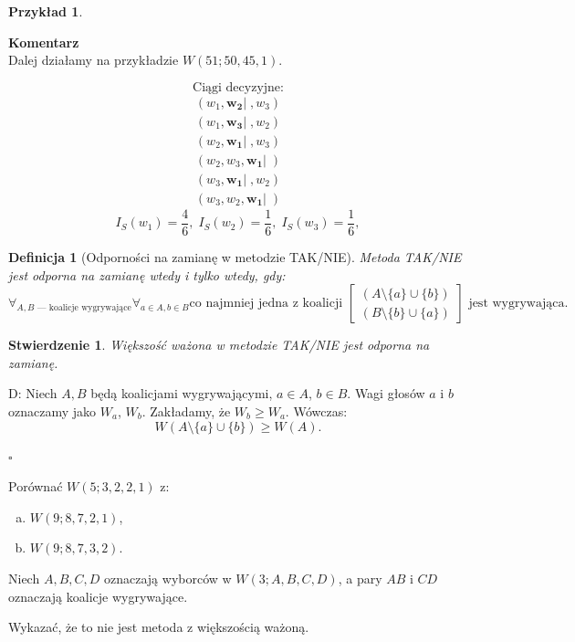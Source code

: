 \documentclass[12pt,a4paper]{article}
\newcounter{twierdzenie}
\theoremstyle{break}
\newcommand{\Komentarz}[1]{
	\begin{mdframed}[style=zadanie]
		\textbf{Komentarz}\\
		#1
	\end{mdframed}
	}
\newtheorem{definition}{Definicja}[section]
\newtheorem{example}{Przykład}[section]
\newtheorem{stwierdzenie}{Stwierdzenie}[section]
\begin{document}
	\begin{example}\end{example}
	\Komentarz{Dalej działamy na przykładzie $W(51;50,45,1)$.}
		
	\[
	\text{Ciągi decyzyjne:}
	\]
	\begin{align*}
		(w_1, \mathbf{w_2}|\;, w_3) \\
		(w_1, \mathbf{w_3}|\;, w_2) \\
		(w_2, \mathbf{w_1}|\;, w_3) \\
		(w_2, w_3, \mathbf{w_1}|\;) \\
		(w_3, \mathbf{w_1}|\;, w_2) \\
		(w_3, w_2, \mathbf{w_1}|\;)
	\end{align*}
	$$I_S(w_1) = \frac{4}{6}, \; I_S(w_2) = \frac{1}{6}, \; I_S(w_3) = \frac{1}{6},$$
	
	\begin{definition}[Odporności na zamianę w metodzie TAK/NIE]
		Metoda TAK/NIE jest odporna na zamianę wtedy i tylko wtedy, gdy:
		\[
		\forall_{A, B \text{ — koalicje wygrywające}} \forall_{a \in A, b \in B} \text{co najmniej jedna z koalicji } 
		\begin{bmatrix}
			(A \setminus \{a\} \cup \{b\}) \\
			(B \setminus \{b\} \cup \{a\})
		\end{bmatrix}
		\text{ jest wygrywająca.}
		\]
	\end{definition}
	\newpage

	\begin{stwierdzenie}
		Większość ważona w metodzie TAK/NIE jest odporna na zamianę.
	\end{stwierdzenie}
	
	D:  
	Niech $A, B$ będą koalicjami wygrywającymi, $a \in A$, $b \in B$.  
	Wagi głosów $a$ i $b$ oznaczamy jako $W_a$, $W_b$.  
	Zakładamy, że $W_b \geq W_a$. Wówczas:
	\[
	W(A \setminus \{a\} \cup \{b\}) \geq W(A).
	\]
	\begin{flushright}$\square$\end{flushright}
	
	\begin{zad}
		Porównać $W(5; 3, 2, 2, 1)$ z:
		\begin{enumerate}[a)]
			\item $W(9; 8, 7, 2, 1)$,
			\item $W(9; 8, 7, 3, 2)$.
		\end{enumerate}
	\end{zad}
	
	\begin{zad}
		Niech $A, B, C, D$ oznaczają wyborców w $W(3; A, B, C, D)$, a pary $AB$ i $CD$ oznaczają koalicje wygrywające.
		
		Wykazać, że to nie jest metoda z większością ważoną.
	\end{zad}
	
\end{document}
